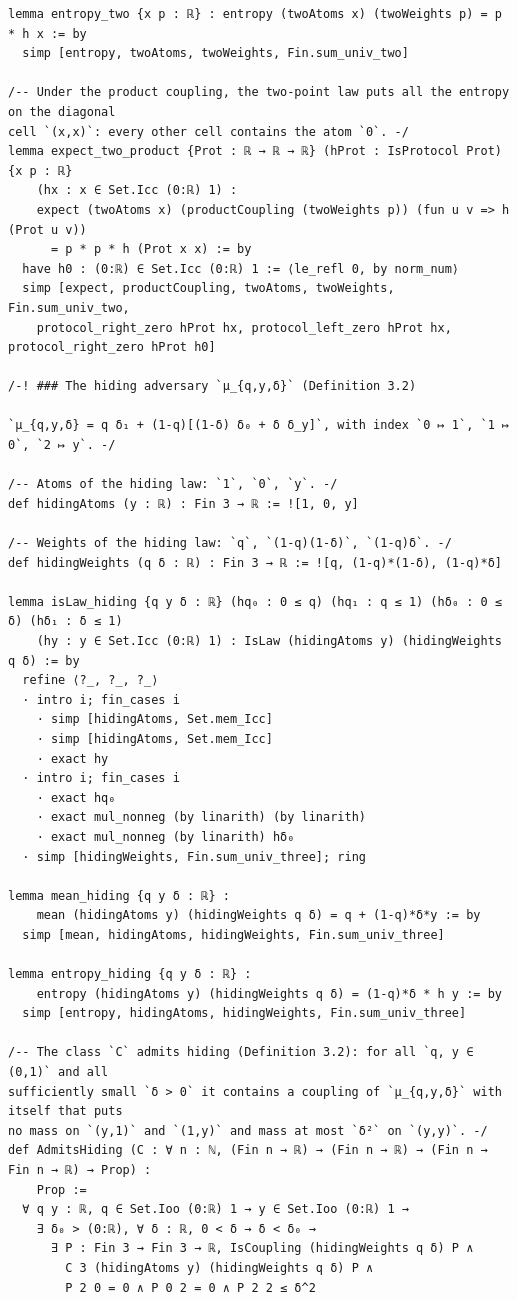 \documentclass[11pt,a4paper]{article}
\theoremstyle{definition}
\theoremstyle{remark}
\begin{document}
\begin{Verbatim}[fontsize=\scriptsize,formatcom=\leanmono,samepage=false]
lemma entropy_two {x p : ℝ} : entropy (twoAtoms x) (twoWeights p) = p * h x := by
  simp [entropy, twoAtoms, twoWeights, Fin.sum_univ_two]

/-- Under the product coupling, the two-point law puts all the entropy on the diagonal
cell `(x,x)`: every other cell contains the atom `0`. -/
lemma expect_two_product {Prot : ℝ → ℝ → ℝ} (hProt : IsProtocol Prot) {x p : ℝ}
    (hx : x ∈ Set.Icc (0:ℝ) 1) :
    expect (twoAtoms x) (productCoupling (twoWeights p)) (fun u v => h (Prot u v))
      = p * p * h (Prot x x) := by
  have h0 : (0:ℝ) ∈ Set.Icc (0:ℝ) 1 := ⟨le_refl 0, by norm_num⟩
  simp [expect, productCoupling, twoAtoms, twoWeights, Fin.sum_univ_two,
    protocol_right_zero hProt hx, protocol_left_zero hProt hx, protocol_right_zero hProt h0]

/-! ### The hiding adversary `μ_{q,y,δ}` (Definition 3.2)

`μ_{q,y,δ} = q δ₁ + (1-q)[(1-δ) δ₀ + δ δ_y]`, with index `0 ↦ 1`, `1 ↦ 0`, `2 ↦ y`. -/

/-- Atoms of the hiding law: `1`, `0`, `y`. -/
def hidingAtoms (y : ℝ) : Fin 3 → ℝ := ![1, 0, y]

/-- Weights of the hiding law: `q`, `(1-q)(1-δ)`, `(1-q)δ`. -/
def hidingWeights (q δ : ℝ) : Fin 3 → ℝ := ![q, (1-q)*(1-δ), (1-q)*δ]

lemma isLaw_hiding {q y δ : ℝ} (hq₀ : 0 ≤ q) (hq₁ : q ≤ 1) (hδ₀ : 0 ≤ δ) (hδ₁ : δ ≤ 1)
    (hy : y ∈ Set.Icc (0:ℝ) 1) : IsLaw (hidingAtoms y) (hidingWeights q δ) := by
  refine ⟨?_, ?_, ?_⟩
  · intro i; fin_cases i
    · simp [hidingAtoms, Set.mem_Icc]
    · simp [hidingAtoms, Set.mem_Icc]
    · exact hy
  · intro i; fin_cases i
    · exact hq₀
    · exact mul_nonneg (by linarith) (by linarith)
    · exact mul_nonneg (by linarith) hδ₀
  · simp [hidingWeights, Fin.sum_univ_three]; ring

lemma mean_hiding {q y δ : ℝ} :
    mean (hidingAtoms y) (hidingWeights q δ) = q + (1-q)*δ*y := by
  simp [mean, hidingAtoms, hidingWeights, Fin.sum_univ_three]

lemma entropy_hiding {q y δ : ℝ} :
    entropy (hidingAtoms y) (hidingWeights q δ) = (1-q)*δ * h y := by
  simp [entropy, hidingAtoms, hidingWeights, Fin.sum_univ_three]

/-- The class `C` admits hiding (Definition 3.2): for all `q, y ∈ (0,1)` and all
sufficiently small `δ > 0` it contains a coupling of `μ_{q,y,δ}` with itself that puts
no mass on `(y,1)` and `(1,y)` and mass at most `δ²` on `(y,y)`. -/
def AdmitsHiding (C : ∀ n : ℕ, (Fin n → ℝ) → (Fin n → ℝ) → (Fin n → Fin n → ℝ) → Prop) :
    Prop :=
  ∀ q y : ℝ, q ∈ Set.Ioo (0:ℝ) 1 → y ∈ Set.Ioo (0:ℝ) 1 →
    ∃ δ₀ > (0:ℝ), ∀ δ : ℝ, 0 < δ → δ < δ₀ →
      ∃ P : Fin 3 → Fin 3 → ℝ, IsCoupling (hidingWeights q δ) P ∧
        C 3 (hidingAtoms y) (hidingWeights q δ) P ∧
        P 2 0 = 0 ∧ P 0 2 = 0 ∧ P 2 2 ≤ δ^2


\end{Verbatim}
\end{document}
